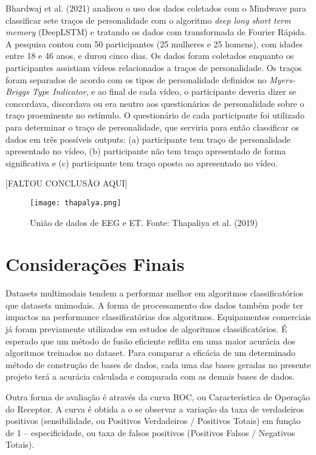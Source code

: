 Bhardwaj et al. (2021) analisou o uso dos dados coletados com o Mindwave para classificar sete traços de personalidade 
com o algoritmo \textit{deep long short term memory} (DeepLSTM) e tratando os dados com transformada de Fourier Rápida. 
A pesquisa contou com 50 participantes (25 mulheres e 25 homens), com idades entre 18 e 46 anos, e durou cinco dias.
Os dados foram coletados enquanto os participantes assistiam vídeos relacionados a traços de personalidade. 
 Os traços foram separados de acordo com os tipos de personalidade definidos no \textit{Myers-Briggs Type Indicator}, 
 e ao final de cada vídeo, o participante deveria dizer se concordava, 
 discordava ou era neutro aos questionários de personalidade sobre o traço proeminente no estímulo. 
 O questionário de cada participante foi utilizado para determinar o traço de personalidade, 
 que serviria para então classificar os dados em três possíveis outputs: 
 (a) participante tem traço de personalidade apresentado no vídeo, (b) participante não tem traço apresentado de forma significativa 
 e (c) participante tem traço oposto ao apresentado no vídeo.
 
 [FALTOU CONCLUSÃO AQUI]


\begin{figure}
      \centering
      \texttt{[image: thapalya.png]}
      \caption{União de dados de EEG e ET. Fonte: Thapaliya et al. (2019)}
\end{figure}

\clearpage

\section{Considerações Finais}
Datasets multimodais tendem a performar melhor em algoritmos classificatórios que datasets unimodais. 
A forma de processamento dos dados também pode ter impactos na performance classificatórias dos algoritmos. 
Equipamentos comerciais já foram previamente utilizados em estudos de algoritmos classificatórios. 
É esperado que um método de fusão eficiente reflita em uma maior acurácia dos algoritmos treinados no dataset. 
Para comparar a eficácia de um determinado método de construção de bases de dados, 
cada uma das bases geradas no presente projeto terá a acurácia calculada e comparada com as demais bases de dados.





Outra forma de avaliação é através da curva ROC, 
ou Característica de Operação do Receptor. A curva é obtida a
o se observar a variação da taxa de verdadeiros positivos (sensibilidade, ou Positivos Verdadeiros / Positivos Totais) em função de 1 – 
especificidade, ou taxa de falsos positivos (Positivos Falsos / Negativos Totais). 